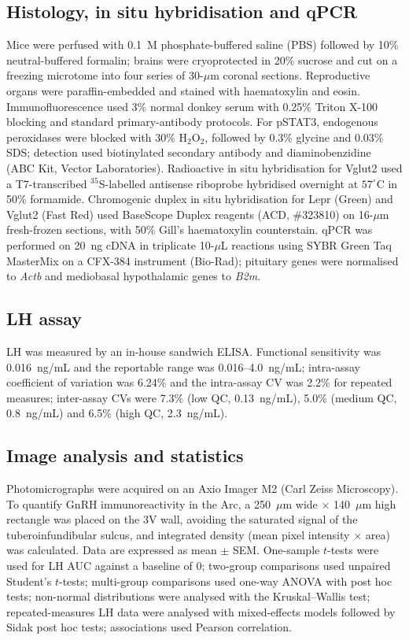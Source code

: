 \documentclass[11pt]{article}
\begin{document}
\subsection{Histology, in situ hybridisation and qPCR}
Mice were perfused with 0.1~M phosphate-buffered saline (PBS) followed by 10\% neutral-buffered formalin; brains were cryoprotected in 20\% sucrose and cut on a freezing microtome into four series of 30-$\mu$m coronal sections. Reproductive organs were paraffin-embedded and stained with haematoxylin and eosin. Immunofluorescence used 3\% normal donkey serum with 0.25\% Triton X-100 blocking and standard primary-antibody protocols. For pSTAT3, endogenous peroxidases were blocked with 30\% H$_{2}$O$_{2}$, followed by 0.3\% glycine and 0.03\% SDS; detection used biotinylated secondary antibody and diaminobenzidine (ABC Kit, Vector Laboratories). Radioactive in situ hybridisation for Vglut2 used a T7-transcribed $^{35}$S-labelled antisense riboprobe hybridised overnight at $57^{\circ}$C in 50\% formamide. Chromogenic duplex in situ hybridisation for Lepr (Green) and Vglut2 (Fast Red) used BaseScope Duplex reagents (ACD, \#323810) on 16-$\mu$m fresh-frozen sections, with 50\% Gill's haematoxylin counterstain. qPCR was performed on 20~ng cDNA in triplicate 10-$\mu$L reactions using SYBR Green Taq MasterMix on a CFX-384 instrument (Bio-Rad); pituitary genes were normalised to \textit{Actb} and mediobasal hypothalamic genes to \textit{B2m}.

\subsection{LH assay}
LH was measured by an in-house sandwich ELISA. Functional sensitivity was 0.016~ng/mL and the reportable range was 0.016--4.0~ng/mL; intra-assay coefficient of variation was 6.24\% and the intra-assay CV was 2.2\% for repeated measures; inter-assay CVs were 7.3\% (low QC, 0.13~ng/mL), 5.0\% (medium QC, 0.8~ng/mL) and 6.5\% (high QC, 2.3~ng/mL).

\subsection{Image analysis and statistics}
Photomicrographs were acquired on an Axio Imager M2 (Carl Zeiss Microscopy). To quantify GnRH immunoreactivity in the Arc, a 250~$\mu$m wide $\times$ 140~$\mu$m high rectangle was placed on the 3V wall, avoiding the saturated signal of the tuberoinfundibular sulcus, and integrated density (mean pixel intensity $\times$ area) was calculated. Data are expressed as mean $\pm$ SEM. One-sample $t$-tests were used for LH AUC against a baseline of 0; two-group comparisons used unpaired Student's $t$-tests; multi-group comparisons used one-way ANOVA with post hoc tests; non-normal distributions were analysed with the Kruskal--Wallis test; repeated-measures LH data were analysed with mixed-effects models followed by Sidak post hoc tests; associations used Pearson correlation.
\end{document}
